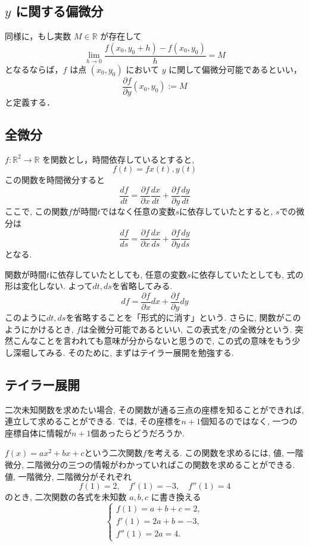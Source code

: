 \documentclass{ltjsarticle}
\begin{document}
\subsection*{$y$ に関する偏微分}
同様に，もし実数 $M \in \mathbb{R}$ が存在して
\[
\lim_{h \to 0} 
\frac{f(x_0, y_0 + h) - f(x_0,y_0)}{h} = M
\]
となるならば，$f$ は点 $(x_0,y_0)$ において $y$ に関して偏微分可能であるといい，
\[
\frac{\partial f}{\partial y}(x_0,y_0) := M
\]
と定義する．


\subsection{全微分}
$f : \mathbb{R}^2 \to \mathbb{R}$ を関数とし，時間依存しているとすると, 
\[
f(t)=f{x(t),y(t)}
\]
この関数を時間微分すると
\[
\frac{d f}{d t} = \frac{\partial f}{\partial x}\frac{d x}{d t}+\frac{\partial f}{\partial y}\frac{d y}{d t}
\]
ここで, この関数$f$が時間$t$ではなく任意の変数$s$に依存していたとすると, $s$での微分は
\[
\frac{d f}{d s} = \frac{\partial f}{\partial x}\frac{d x}{d s}+\frac{\partial f}{\partial y}\frac{d y}{d s}
\]
となる. 

関数が時間$t$に依存していたとしても, 任意の変数$s$に依存していたとしても, 式の形は変化しない. 
よって$dt,ds$を省略してみる. 
\[
df = \frac{\partial f}{\partial x}d x+\frac{\partial f}{\partial y}d y
\]
このように$dt,ds$を省略することを「形式的に消す」という. 
さらに, 関数がこのようにかけるとき, $f$は全微分可能であるといい, この表式を$f$の全微分という. 
突然こんなことを言われても意味が分からないと思うので, この式の意味をもう少し深堀してみる. 
そのために, まずはテイラー展開を勉強する. 

\subsection{テイラー展開}
二次未知関数を求めたい場合, その関数が通る三点の座標を知ることができれば, 連立して求めることができる. 
では, その座標を$n+1$個知るのではなく, 一つの座標自体に情報が$n+1$個あったらどうだろうか. 

$f(x) = ax^2 + bx + c$という二次関数$f$を考える. この関数を求めるには, 
値, 一階微分, 二階微分の三つの情報がわかっていればこの関数を求めることができる. 
値, 一階微分, 二階微分がそれぞれ
\[
f(1)=2, \quad f'(1)=-3 , \quad f''(1)=4
\]
のとき, 二次関数の各式を未知数 \(a,b,c\) に書き換える
\[
\begin{cases}
f(1) = a + b + c = 2,\\[2mm]
f'(1) = 2a + b = -3,\\[1mm]
f''(1) = 2a = 4.
\end{cases}
\]
\end{document}

